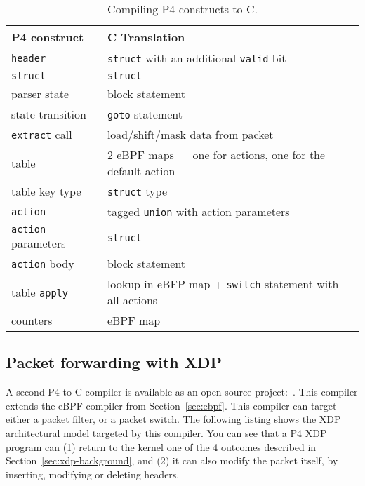 \begin{table}[h]
  \footnotesize
  \begin{center}
  \begin{tabular}{|l|p{5cm}|} \hline
    \textbf{P4 construct} & \textbf{C Translation} \\ \hline \hline
    \texttt{header} & \texttt{struct} with an additional \texttt{valid} bit \\ \hline
    \texttt{struct} & \texttt{struct} \\ \hline
    parser state    & block statement \\ \hline
    state transition & \texttt{goto} statement \\ \hline
    \texttt{extract} call & load/shift/mask data from packet \\ \hline
    table & 2 eBPF maps --- one for actions, one for the default action \\ \hline
    table key type & \texttt{struct} type \\ \hline
    \texttt{action} & tagged \texttt{union} with action parameters \\ \hline
    \texttt{action} parameters & \texttt{struct} \\ \hline
    \texttt{action} body & block statement \\ \hline
    table \texttt{apply} & lookup in eBFP map + \texttt{switch} statement with all actions \\ \hline
    counters & eBPF map \\ \hline
  \end{tabular}
  \end{center}
  \caption{Compiling P4 constructs to C.}\label{table:translation}
\end{table}

\subsection{Packet forwarding with XDP}\label{sec:xdp}

A second P4 to C compiler is available as an open-source
project:~\cite{p4-xdp-backend}.  This compiler extends the eBPF
compiler from Section~\ref{sec:ebpf}.  This compiler can target either
a packet filter, or a packet switch.  The following listing shows the
XDP architectural model targeted by this compiler.  You can see that a
P4 XDP program can (1) return to the kernel one of the 4 outcomes
described in Section~\ref{sec:xdp-background}, and (2) it can also
modify the packet itself, by inserting, modifying or deleting headers.

